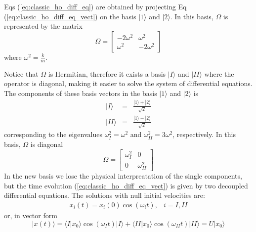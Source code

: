 \documentclass[11pt,fleqn]{book} %
\newcommand{\ket}[1]{| #1\rangle}
\newcommand{\scalar}[2]{\langle #1| #2\rangle}
\begin{document}
Eqs (\ref{eq:classic_ho_diff_eq}) are obtained by projecting Eq (\ref{eq:classic_ho_diff_eq_vect}) on the basis $\ket{1}$ and $\ket{2}$. In this basis, 
$\Omega$ is represented by the matrix
\begin{equation*}
    \Omega = \left[
        \begin{array}{cc}
            -2\omega^2 & \omega^2\\
            \omega^2 & -2\omega^2
        \end{array}
    \right]
\end{equation*}
where $\omega^2 = \frac{k}{m}$. 

Notice that $\Omega$ is Hermitian, therefore it exists a basis $\ket{I}$ and $\ket{II}$ where the operator is diagonal, making it easier to solve the 
system of differential equations.
The components of these basis vectors in the basis $\ket{1}$ and $\ket{2}$ is
\begin{subequations}
    \begin{eqnarray}
        \ket{I} &=& \frac{\ket{1}+\ket{2}}{\sqrt{2}} \\
        \ket{II} &=& \frac{\ket{1}-\ket{2}}{\sqrt{2}}
    \end{eqnarray}
\end{subequations}
corresponding to the eigenvalues $\omega_I^2=\omega^2$ and $\omega_{II}^2 = 3\omega^2$, respectively. In this basis, $\Omega$ is diagonal
\begin{equation*}
    \Omega = \left[
        \begin{array}{cc}
            \omega_I^2 & 0\\
            0 & \omega_{II}^2
        \end{array}
    \right]
\end{equation*}
In the new basis we lose the physical interpreatation of the single components, but the time evolution (\ref{eq:classic_ho_diff_eq_vect}) is given
by two decoupled differential equations. The solutions with null initial velocities are:
\begin{equation*}
    \begin{array}{cc}
        x_i(t) = x_i(0)\cos(\omega_i t), & i=I,II
    \end{array}
\end{equation*}
or, in vector form
\begin{equation*}
    \ket{x(t)} = \scalar{I}{x_0}\cos(\omega_I t)\ket{I} + \scalar{II}{x_0}\cos(\omega_{II} t)\ket{II} = 
    U\ket{x_0}
\end{equation*}
\end{document}
